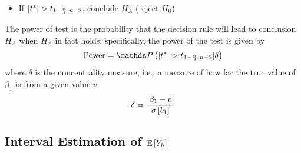 \begin{itemize}
\begin{itemize}
\item If $\abs{t^*} > t_{1 - \frac{\alpha}{2}, n-2}$, conclude $H_A$ (reject $H_0$) \end{itemize} 
The power of test is the probability that the decision rule will lead to conclusion $H_A$ when $H_A$ in fact holds; specifically, the power of the test is given by 
$$ \text{Power} = \prob{\abs{t^*} > \tdist{1 - \frac{\alpha}{2}}{n-2} | \delta} $$ where $\delta$ is the noncentrality measure, i.e., a measure of how far the true value of $\beta_1$ is from a given value $v$ $$ \delta = \frac{\abs{\beta_1 - v}}{\sigma \left[ b_1 \right]} $$ 
\end{itemize}

\subsection{Interval Estimation of $\mathrm{E}\left[ Y_h \right]$}
